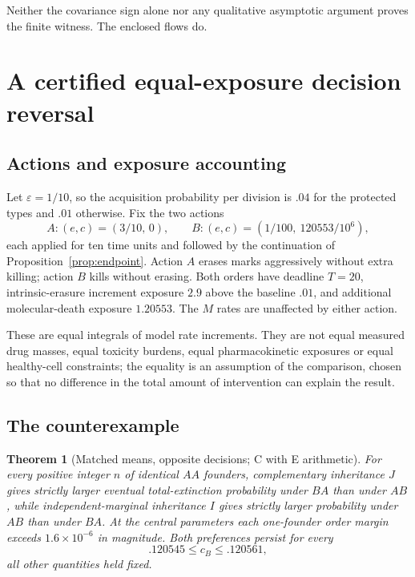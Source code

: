\documentclass[11pt]{article}
\newtheorem{theorem}{Theorem}[section]
\theoremstyle{remark}
\newcommand{\eps}{\varepsilon}
\begin{document}
Neither the covariance sign alone nor any qualitative asymptotic argument proves
the finite witness. The enclosed flows do.

\section{A certified equal-exposure decision reversal}\label{sec:certified}

\subsection{Actions and exposure accounting}
Let $\eps=1/10$, so the acquisition probability per division is $.04$ for the
protected types and $.01$ otherwise. Fix the two actions
\[
 A:(e,c)=(3/10,\,0),\qquad B:(e,c)=(1/100,\ 120553/10^6),
\]
each applied for ten time units and followed by the continuation of
Proposition~\ref{prop:endpoint}. Action $A$ erases marks aggressively without
extra killing; action $B$ kills without erasing. Both orders have deadline
$T=20$, intrinsic-erasure increment exposure $2.9$ above the baseline $.01$, and
additional molecular-death exposure $1.20553$. The $M$ rates are unaffected by
either action.

These are equal integrals of model rate increments. They are not equal measured
drug masses, equal toxicity burdens, equal pharmacokinetic exposures or equal
healthy-cell constraints; the equality is an assumption of the comparison, chosen
so that no difference in the total amount of intervention can explain the result.

\subsection{The counterexample}

\begin{theorem}[Matched means, opposite decisions; C with E arithmetic]
\label{thm:decision}
For every positive integer $n$ of identical $AA$ founders, complementary
inheritance $J$ gives strictly larger eventual total-extinction probability under
$BA$ than under $AB$, while independent-marginal inheritance $I$ gives strictly
larger probability under $AB$ than under $BA$. At the central parameters each
one-founder order margin exceeds $1.6\times10^{-6}$ in magnitude. Both
preferences persist for every
\begin{equation}
 .120545\le c_B\le.120561,\label{eq:neighborhood}
\end{equation}
all other quantities held fixed.
\end{theorem}
\end{document}
